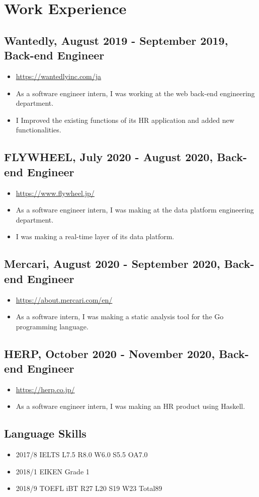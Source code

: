 \documentclass{article}
\begin{document}
\section*{Work Experience}
    \subsection*{Wantedly, August 2019 - September 2019, Back-end Engineer}
        \begin{itemize}
            \item \url{https://wantedlyinc.com/ja}
            \item As a software engineer intern, I was working at the web back-end engineering department.
            \item I Improved the existing functions of its HR application and added new functionalities.
        \end{itemize}

    \subsection*{FLYWHEEL, July 2020 - August 2020, Back-end Engineer}
        \begin{itemize}
            \item \url{https://www.flywheel.jp/}
            \item As a software engineer intern, I was making at the data platform engineering department.
            \item I was making a real-time layer of its data platform.
        \end{itemize}

    \subsection*{Mercari, August 2020 - September 2020, Back-end Engineer}
        \begin{itemize}
            \item \url{https://about.mercari.com/en/}
            \item As a software intern, I was making a static analysis tool for the Go programming language.
        \end{itemize}

    \subsection*{HERP, October 2020 - November 2020, Back-end Engineer}
        \begin{itemize}
            \item \url{https://herp.co.jp/}
            \item As a software engineer intern, I was making an HR product using Haskell.
        \end{itemize}

\subsection*{Language Skills}
    \begin{itemize}
        \item 2017/8 IELTS L7.5 R8.0 W6.0 S5.5 OA7.0
        \item 2018/1 EIKEN Grade 1
        \item 2018/9 TOEFL iBT R27 L20 S19 W23 Total89
    \end{itemize}
\end{document}
